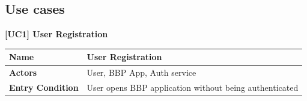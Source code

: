 \subsection{Use cases}
\begin{table}[H]
    \centering
    \raggedright \textbf{\large [UC1] User Registration} \\[0.2cm]
    \renewcommand{\arraystretch}{1.5}
    
    \begin{tabularx}{\textwidth}{|l|X|}
        \hline
        
        \textbf{Name} & \textbf{User Registration} \\ \hline
        
        \textbf{Actors} & User, BBP App, Auth service \\ \hline
        
        \textbf{Entry Condition} & User opens BBP application without being authenticated \\ \hline
        

\end{tabularx}
\end{table}
